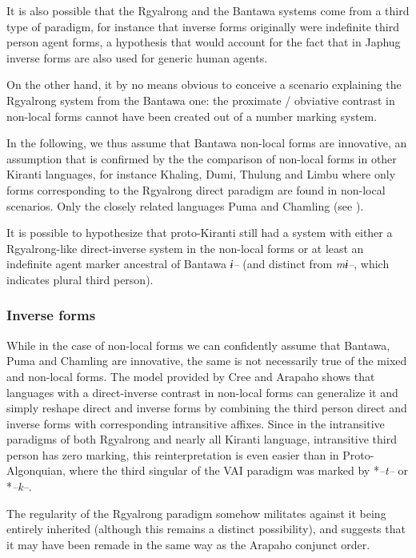\documentclass[twoside,a4paper,11pt]{article}
\newcommand{\ipa}[1]{{\phon\textit{#1}}}
\newcommand{\Σ}{\greek{Σ}}
\begin{document}
It is also possible that the Rgyalrong and the Bantawa systems come from a third type of paradigm, for instance that inverse forms originally were indefinite third person agent forms, a hypothesis that would account for the fact that in Japhug inverse forms are also used for generic human agents. 

On the other hand, it by no means obvious to conceive a scenario explaining the Rgyalrong system from the Bantawa one: the proximate / obviative contrast in non-local forms cannot have been created out of a   number marking system. 
 
In the following, we thus assume that Bantawa non-local forms are innovative, an assumption that is confirmed by the the comparison of non-local forms in other Kiranti languages, for instance Khaling, Dumi, Thulung and  Limbu where only  forms corresponding to the Rgyalrong direct paradigm are found in non-local scenarios. Only the closely related languages Puma  and Chamling (see \citealt{bickel07puma}).

It is possible to hypothesize that proto-Kiranti still had a system with either a Rgyalrong-like direct-inverse system in the non-local forms or at least an indefinite agent marker ancestral of Bantawa \ipa{ɨ--} (and distinct from \ipa{mɨ--}, which indicates plural third person).

\subsubsection{Inverse forms}
While in the case of non-local forms we can confidently assume that Bantawa, Puma and Chamling are innovative, the same is not necessarily true of the mixed and non-local forms. The model provided by Cree and Arapaho shows that languages with a direct-inverse contrast in non-local forms can generalize it and simply reshape direct and inverse forms by combining the third person direct and inverse forms with corresponding intransitive affixes. Since in the intransitive paradigms of both Rgyalrong and nearly all Kiranti language, intransitive third person has zero marking, this reinterpretation is even easier than in Proto-Algonquian, where the third singular of the VAI paradigm was marked by *\ipa{--t--} or *\ipa{--k--}.

The regularity of the Rgyalrong paradigm somehow militates against it being entirely inherited (although this remains a distinct possibility), and suggests that it may have been remade in the same way as the Arapaho conjunct order. 
\end{document}
